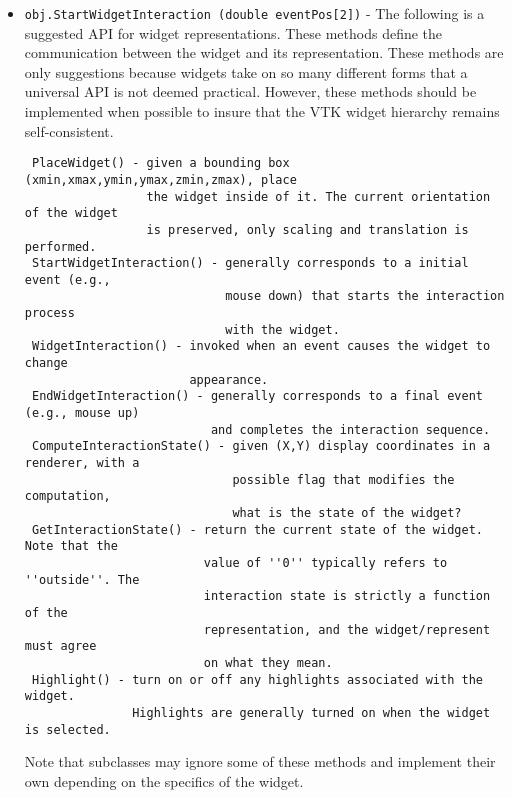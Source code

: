 \begin{itemize}
\item  \verb|obj.StartWidgetInteraction (double eventPos[2])| -  The following is a suggested API for widget representations. These methods
 define the communication between the widget and its representation. These
 methods are only suggestions because widgets take on so many different
 forms that a universal API is not deemed practical. However, these methods
 should be implemented when possible to insure that the VTK widget hierarchy
 remains self-consistent.
 \begin{verbatim}
 PlaceWidget() - given a bounding box (xmin,xmax,ymin,ymax,zmin,zmax), place 
                 the widget inside of it. The current orientation of the widget 
                 is preserved, only scaling and translation is performed.
 StartWidgetInteraction() - generally corresponds to a initial event (e.g.,
                            mouse down) that starts the interaction process
                            with the widget.
 WidgetInteraction() - invoked when an event causes the widget to change 
                       appearance.
 EndWidgetInteraction() - generally corresponds to a final event (e.g., mouse up)
                          and completes the interaction sequence.
 ComputeInteractionState() - given (X,Y) display coordinates in a renderer, with a
                             possible flag that modifies the computation,
                             what is the state of the widget?
 GetInteractionState() - return the current state of the widget. Note that the
                         value of ''0'' typically refers to ''outside''. The 
                         interaction state is strictly a function of the
                         representation, and the widget/represent must agree
                         on what they mean.
 Highlight() - turn on or off any highlights associated with the widget.
               Highlights are generally turned on when the widget is selected.
 \end{verbatim}
 Note that subclasses may ignore some of these methods and implement their own
 depending on the specifics of the widget.


\end{itemize}
